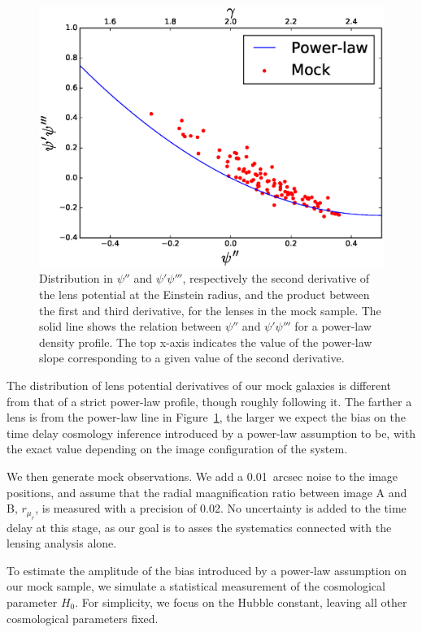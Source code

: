 \documentclass[usenatbib]{mnras}
\def\psii{\psi'}
\def\psiii{\psi''}
\def\psiiii{\psi'''}
\def\radmagrat{r_{\mu_r}}
\def\Fref#1{Figure~\ref{#1}\xspace}
\begin{document}
\begin{figure}
 \includegraphics[width=\columnwidth]{psi_plot.eps}
 \caption{Distribution in $\psiii$ and $\psii\psiiii$, respectively the second derivative of the lens potential at the Einstein radius, and the product between the first and third derivative, for the lenses in the mock sample.
The solid line shows the relation between $\psiii$ and $\psii\psiiii$ for a power-law density profile. The top x-axis indicates the value of the power-law slope corresponding to a given value of the second derivative.
}
 \label{fig:psi}
\end{figure}
%
The distribution of lens potential derivatives of our mock galaxies is different from that of a strict power-law profile, though roughly following it.
The farther a lens is from the power-law line in \Fref{fig:psi}, the larger we expect the bias on the time delay cosmology inference introduced by a power-law assumption to be, with the exact value depending on the image configuration of the system.

We then generate mock observations. We add a 0.01~arcsec noise to the image positions, and assume that the radial maagnification ratio between image A and B, $\radmagrat$, is measured with a precision of 0.02.
No uncertainty is added to the time delay at this stage, as our goal is to asses the systematics connected with the lensing analysis alone.

To estimate the amplitude of the bias introduced by a power-law assumption on our mock sample, we simulate a statistical measurement of the cosmological parameter $H_0$.
For simplicity, we focus on the Hubble constant, leaving all other cosmological parameters fixed.
\end{document}
